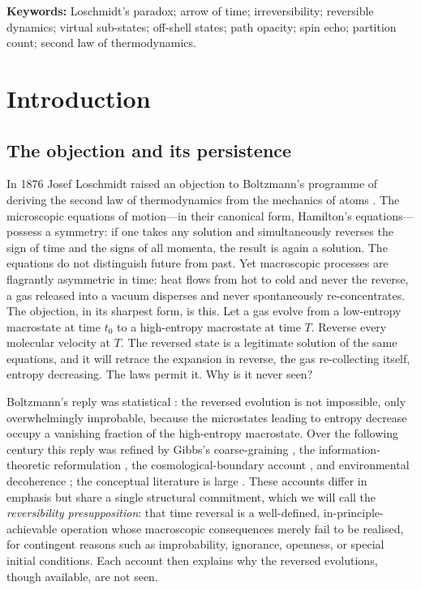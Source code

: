 \documentclass[11pt,a4paper]{article}
\theoremstyle{thmstyle}
\theoremstyle{definition}
\theoremstyle{remark}
\begin{document}
\noindent\textbf{Keywords:} Loschmidt's paradox; arrow of time;
irreversibility; reversible dynamics; virtual sub-states; off-shell
states; path opacity; spin echo; partition count; second law of
thermodynamics.

\tableofcontents

\section{Introduction}
\label{sec:intro}

\subsection{The objection and its persistence}
\label{sec:objection}

In 1876 Josef Loschmidt raised an objection to Boltzmann's programme of
deriving the second law of thermodynamics from the mechanics of atoms
\citep{loschmidt1876}. The microscopic equations of motion---in their
canonical form, Hamilton's equations---possess a symmetry: if one takes
any solution and simultaneously reverses the sign of time and the signs
of all momenta, the result is again a solution. The equations do not
distinguish future from past. Yet macroscopic processes are flagrantly
asymmetric in time: heat flows from hot to cold and never the reverse, a
gas released into a vacuum disperses and never spontaneously
re-concentrates. The objection, in its sharpest form, is this. Let a gas
evolve from a low-entropy macrostate at time $t_0$ to a high-entropy
macrostate at time $T$. Reverse every molecular velocity at $T$. The
reversed state is a legitimate solution of the same equations, and it
will retrace the expansion in reverse, the gas re-collecting itself,
entropy decreasing. The laws permit it. Why is it never seen?

Boltzmann's reply was statistical \citep{boltzmann1877}: the reversed
evolution is not impossible, only overwhelmingly improbable, because the
microstates leading to entropy decrease occupy a vanishing fraction of
the high-entropy macrostate. Over the following century this reply was
refined by Gibbs's coarse-graining \citep{gibbs1902}, the
information-theoretic reformulation \citep{jaynes1957}, the
cosmological-boundary account \citep{penrose1989}, and environmental
decoherence \citep{zurek2003}; the conceptual literature is large
\citep{ehrenfest1959,reichenbach1956,price1996,zeh2007,lebowitz1993}.
These accounts differ in emphasis but share a single structural
commitment, which we will call the \emph{reversibility presupposition}:
that time reversal is a well-defined, in-principle-achievable operation
whose macroscopic consequences merely fail to be realised, for contingent
reasons such as improbability, ignorance, openness, or special initial
conditions. Each account then explains why the reversed evolutions,
though available, are not seen.
\end{document}
